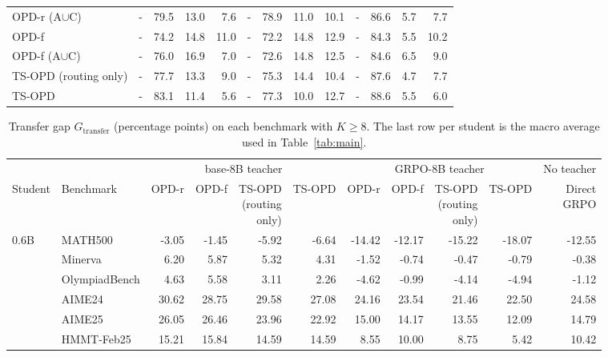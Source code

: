 \documentclass[10pt]{article}
\begin{document}
\begin{table}[h]
\begin{tabular}{lrrrrrrrrrrrr}
OPD-r (A$\cup$C) & - & 79.5 & 13.0 & 7.6 & - & 78.9 & 11.0 & 10.1 & - & 86.6 & 5.7 & 7.7 \\
OPD-f & - & 74.2 & 14.8 & 11.0 & - & 72.2 & 14.8 & 12.9 & - & 84.3 & 5.5 & 10.2 \\
OPD-f (A$\cup$C) & - & 76.0 & 16.9 & 7.0 & - & 72.6 & 14.8 & 12.5 & - & 84.6 & 6.5 & 9.0 \\
TS-OPD (routing only) & - & 77.7 & 13.3 & 9.0 & - & 75.3 & 14.4 & 10.4 & - & 87.6 & 4.7 & 7.7 \\
TS-OPD & - & 83.1 & 11.4 & 5.6 & - & 77.3 & 10.0 & 12.7 & - & 88.6 & 5.5 & 6.0 \\
\bottomrule
\end{tabular}

\end{table}
\begin{table}[h]
\centering
\scriptsize
\setlength{\tabcolsep}{3pt}
\caption{Transfer gap $G_{\mathrm{transfer}}$ (percentage points) on each benchmark with $K\ge8$. The last row per student is the macro average used in Table~\ref{tab:main}.}
\label{tab:app-gap}
\setlength{\aboverulesep}{0pt}\setlength{\belowrulesep}{0pt}\renewcommand{\arraystretch}{1.12}
\begin{tabular}{llrrrrrrrr|r}
\toprule
 & & \multicolumn{4}{c}{base-8B teacher} & \multicolumn{4}{c|}{GRPO-8B teacher} & No teacher \\
\cmidrule(lr){3-6}\cmidrule(lr){7-10}
Student & Benchmark & OPD-r & OPD-f & \shortstack{TS-OPD\\(routing\\only)} & TS-OPD & OPD-r & OPD-f & \shortstack{TS-OPD\\(routing\\only)} & TS-OPD & \shortstack{Direct\\GRPO} \\
\midrule
0.6B & MATH500 & -3.05 & -1.45 & -5.92 & -6.64 & -14.42 & -12.17 & -15.22 & -18.07 & -12.55 \\
 & Minerva & 6.20 & 5.87 & 5.32 & 4.31 & -1.52 & -0.74 & -0.47 & -0.79 & -0.38 \\
 & OlympiadBench & 4.63 & 5.58 & 3.11 & 2.26 & -4.62 & -0.99 & -4.14 & -4.94 & -1.12 \\
 & AIME24 & 30.62 & 28.75 & 29.58 & 27.08 & 24.16 & 23.54 & 21.46 & 22.50 & 24.58 \\
 & AIME25 & 26.05 & 26.46 & 23.96 & 22.92 & 15.00 & 14.17 & 13.55 & 12.09 & 14.79 \\
 & HMMT-Feb25 & 15.21 & 15.84 & 14.59 & 14.59 & 8.55 & 10.00 & 8.75 & 5.42 & 10.42 \\

\end{tabular}
\end{table}
\end{document}
